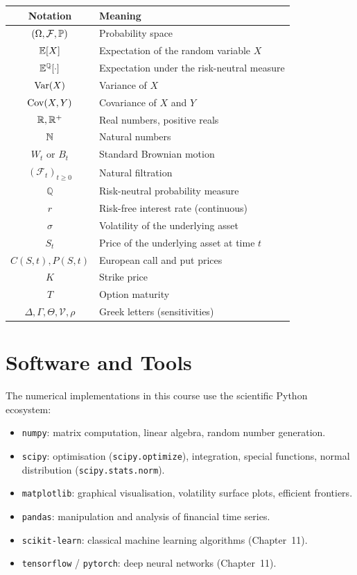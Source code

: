 \begin{center}
\begin{tabular}{cl}
    \toprule
    \textbf{Notation} & \textbf{Meaning} \\
    \midrule
    $(\Omega, \mathcal{F}, \mathbb{P})$ & Probability space \\
    $\mathbb{E}[X]$ & Expectation of the random variable $X$ \\
    $\mathbb{E}^\mathbb{Q}[\cdot]$ & Expectation under the risk-neutral measure \\
    $\mathrm{Var}(X)$ & Variance of $X$ \\
    $\mathrm{Cov}(X,Y)$ & Covariance of $X$ and $Y$ \\
    $\mathbb{R}, \mathbb{R}^+$ & Real numbers, positive reals \\
    $\mathbb{N}$ & Natural numbers \\
    $W_t$ or $B_t$ & Standard Brownian motion \\
    $(\mathcal{F}_t)_{t \geq 0}$ & Natural filtration \\
    $\mathbb{Q}$ & Risk-neutral probability measure \\
    $r$ & Risk-free interest rate (continuous) \\
    $\sigma$ & Volatility of the underlying asset \\
    $S_t$ & Price of the underlying asset at time $t$ \\
    $C(S,t), P(S,t)$ & European call and put prices \\
    $K$ & Strike price \\
    $T$ & Option maturity \\
    $\Delta, \Gamma, \Theta, \mathcal{V}, \rho$ & Greek letters (sensitivities) \\
    \bottomrule
\end{tabular}
\end{center}

\section*{Software and Tools}

The numerical implementations in this course use the scientific Python ecosystem:

\begin{itemize}
    \item \texttt{numpy}: matrix computation, linear algebra, random number
          generation.
    \item \texttt{scipy}: optimisation (\texttt{scipy.optimize}), integration,
          special functions, normal distribution (\texttt{scipy.stats.norm}).
    \item \texttt{matplotlib}: graphical visualisation, volatility surface
          plots, efficient frontiers.
    \item \texttt{pandas}: manipulation and analysis of financial time series.
    \item \texttt{scikit-learn}: classical machine learning algorithms
          (Chapter~11).
    \item \texttt{tensorflow} / \texttt{pytorch}: deep neural networks
          (Chapter~11).
\end{itemize}

